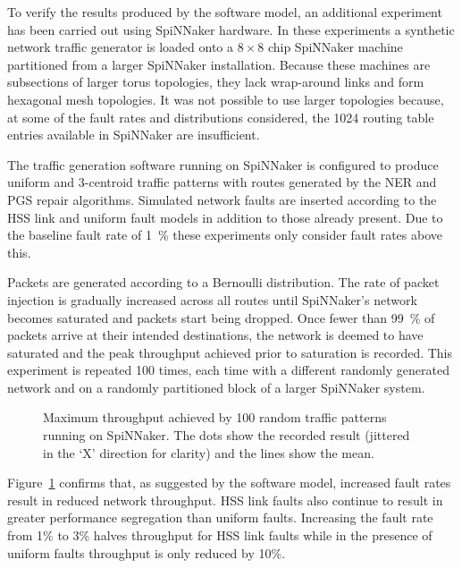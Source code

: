 				To verify the results produced by the software model, an additional
				experiment has been carried out using SpiNNaker hardware. In these
				experiments a synthetic network traffic generator is loaded onto a
				$8\times8$ chip SpiNNaker machine partitioned from a larger SpiNNaker
				installation.  Because these machines are subsections of larger torus
				topologies, they lack wrap-around links and form hexagonal mesh
				topologies. It was not possible to use larger topologies because, at
				some of the fault rates and distributions considered, the \num{1024}
				routing table entries available in SpiNNaker are insufficient.
				
				The traffic generation software running on SpiNNaker is configured to
				produce uniform and 3-centroid traffic patterns with routes generated
				by the NER and PGS repair algorithms. Simulated network faults are
				inserted according to the HSS link and uniform fault models in addition
				to those already present. Due to the baseline fault rate of
				\SI{1}{\percent} these experiments only consider fault rates above
				this.
				
				Packets are generated according to a Bernoulli distribution. The rate
				of packet injection is gradually increased across all routes until
				SpiNNaker's network becomes saturated and packets start being dropped.
				Once fewer than \SI{99}{\percent} of packets arrive at their intended
				destinations, the network is deemed to have saturated and the peak
				throughput achieved prior to saturation is recorded. This experiment is
				repeated 100 times, each time with a different randomly generated
				network and on a randomly partitioned block of a larger SpiNNaker
				system.
				
				\begin{figure}
					\center
					
					\caption[Maximum throughput achieved on SpiNNaker.]%
					{Maximum throughput achieved by \num{100} random traffic
					patterns running on SpiNNaker. The dots show the recorded result
					(jittered in the `X' direction for clarity) and the lines show the
					mean.}
					\label{fig:routing-hardware}
				\end{figure}
				
				Figure~\ref{fig:routing-hardware} confirms that, as suggested by the
				software model, increased fault rates result in reduced network
				throughput. HSS link faults also continue to result in greater
				performance segregation than uniform faults. Increasing the fault rate
				from 1\% to 3\% halves throughput for HSS link faults while in the
				presence of uniform faults throughput is only reduced by 10\%.
				
